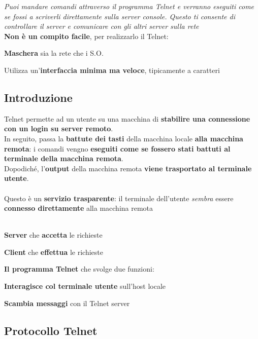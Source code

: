 \documentclass[10pt]{article}
\begin{document}
\textit{Puoi mandare comandi attraverso il programma Telnet e verranno eseguiti come se fossi a scriverli direttamente sulla server console. Questo ti consente di controllare il server e comunicare con gli altri server sulla rete}\\
\textbf{Non è un compito facile}, per realizzarlo il Telnet:
\begin{list}{}{}
\item \textbf{Maschera} sia la rete che i S.O.
\item Utilizza un'\textbf{interfaccia minima ma veloce}, tipicamente a caratteri
\end{list}
\subsection{Introduzione}
Telnet permette ad un utente su una macchina di \textbf{stabilire una connessione con un login su server remoto}.\\In seguito, passa la \textbf{battute dei tasti} della macchina locale \textbf{alla macchina remota}: i comandi vengno \textbf{eseguiti come se fossero stati battuti al terminale della macchina remota}.\\Dopodiché, l'\textbf{output} della macchina remota \textbf{viene trasportato al terminale utente}.\\\\
Questo è un \textbf{servizio trasparente}: il terminale dell'utente \textit{sembra} essere \textbf{connesso direttamente} alla macchina remota\\\\
\begin{list}{}{Il modello di Telnet include:}
\item \textbf{Server} che \textbf{accetta} le richieste
\item \textbf{Client} che \textbf{effettua} le richieste
\item \textbf{Il programma Telnet} che svolge due funzioni:
\begin{list}{}{}
\item \textbf{Interagisce col terminale utente} sull'host locale
\item \textbf{Scambia messaggi} con il Telnet server
\end{list}
\end{list}
\subsection{Protocollo Telnet}
\end{document}
